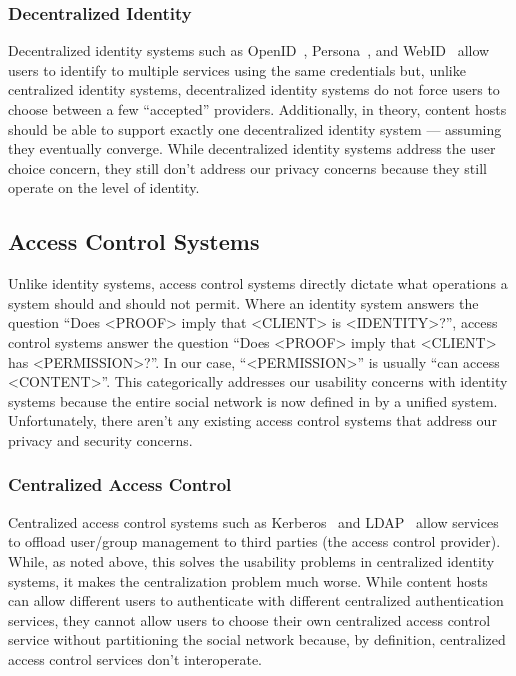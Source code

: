 \documentclass[pdftex,12pt,a4papaer]{report}
\begin{document}
\subsubsection{Decentralized Identity}

Decentralized identity systems such as OpenID~\cite{openid},
Persona~\cite{persona}, and WebID~\cite{webid} allow users to identify to
multiple services using the same credentials but, unlike centralized identity
systems, decentralized identity systems do not force users to choose
between a few ``accepted'' providers. Additionally, in theory, content hosts
should be able to support exactly one decentralized identity system --- assuming
they eventually converge. While decentralized identity systems address the user
choice concern, they still don't address our privacy concerns because they still
operate on the level of identity.

\subsection{Access Control Systems}

Unlike identity systems, access control systems directly dictate what operations
a system should and should not permit. Where an identity system answers the
question ``Does <PROOF> imply that <CLIENT> is <IDENTITY>?'', access control systems
answer the question ``Does <PROOF> imply that <CLIENT> has <PERMISSION>?''. In our
case, ``<PERMISSION>'' is usually ``can access <CONTENT>''. This categorically
addresses our usability concerns with identity systems because the entire social
network is now defined in by a unified system. Unfortunately, there aren't any
existing access control systems that address our privacy and security concerns.

\subsubsection{Centralized Access Control}

Centralized access control systems such as Kerberos~\cite{kerberos} and
LDAP~\cite{ldap} allow services to offload user/group management to third
parties (the access control provider). While, as noted above, this solves the
usability problems in centralized identity systems, it makes the centralization
problem much worse. While content hosts can allow different users to
authenticate with different centralized authentication services, they cannot
allow users to choose their own centralized access control service without
partitioning the social network because, by definition, centralized access
control services don't interoperate.
\end{document}
